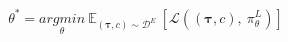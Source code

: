 \begin{equation}
 \label{eq:bc_formula}
 \theta^{*} = \underset{\theta}{argmin} \ \mathbb{E}_{(\boldsymbol{\tau}, c) \sim \mathcal{D}^{E}} \ [\mathcal{L}((\boldsymbol{\tau}, c), \ \pi^{L}_{\theta})]
\end{equation}
